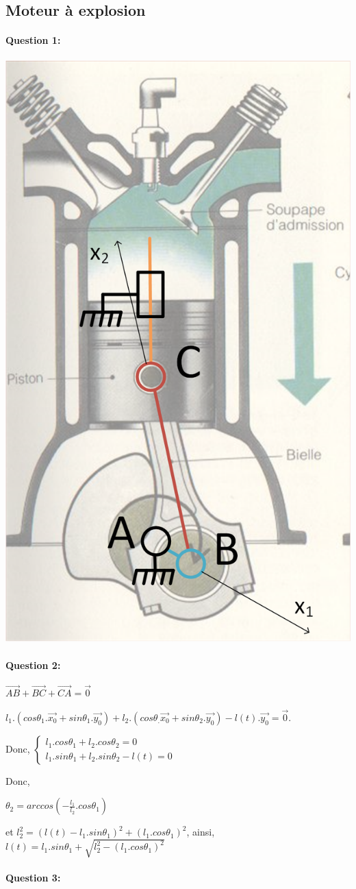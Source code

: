 \subsection{Moteur à explosion}

\paragraph{Question 1:} 

\begin{center}
 \includegraphics[width=0.3\linewidth]{img/cin_cor}
\end{center}

\paragraph{Question 2:} 

$\overrightarrow{AB}+\overrightarrow{BC}+\overrightarrow{CA}=\overrightarrow{0}$

$l_1.(cos\theta_1.\overrightarrow{x_0}+sin\theta_1.\overrightarrow{y_0})+l_2.(cos\theta_.\overrightarrow{x_0}+sin\theta_2.\overrightarrow{y_0})-l(t).\overrightarrow{y_0}=\overrightarrow{0}$.

Donc, $\left\{\begin{array}{l}
l_1.cos\theta_1+l_2.cos\theta_2=0\\
l_1.sin\theta_1+l_2.sin\theta_2-l(t)=0
\end{array}\right.$

Donc,

$\theta_2=arccos\left(-\frac{l_1}{l_2}.cos\theta_1\right)$

et $l_2^2=(l(t)-l_1.sin\theta_1)^2+(l_1.cos\theta_1)^2$, ainsi, $l(t)=l_1.sin\theta_1+\sqrt{l_2^2-(l_1.cos\theta_1)^2}$

\paragraph{Question 3:} 

